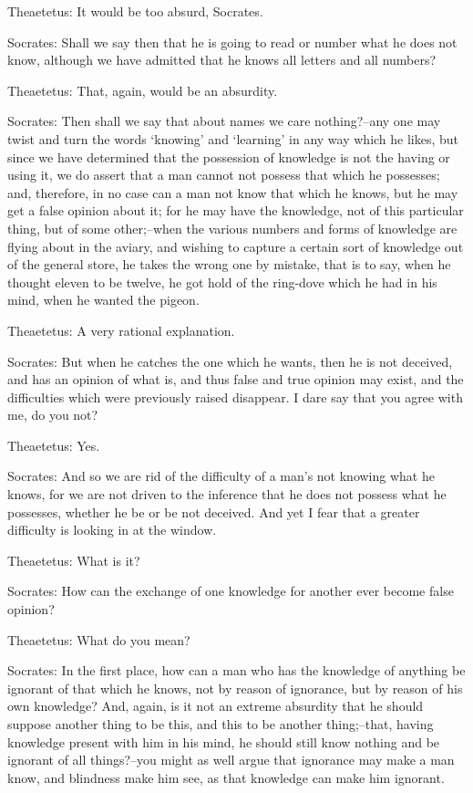 Theaetetus: It would be too absurd, Socrates.

Socrates: Shall we say then that he is going to read or number what he
does not know, although we have admitted that he knows all letters and
all numbers?

Theaetetus: That, again, would be an absurdity.

Socrates: Then shall we say that about names we care nothing?--any one
may twist and turn the words `knowing' and `learning' in any way which
he likes, but since we have determined that the possession of knowledge
is not the having or using it, we do assert that a man cannot not
possess that which he possesses; and, therefore, in no case can a man
not know that which he knows, but he may get a false opinion about it;
for he may have the knowledge, not of this particular thing, but of some
other;--when the various numbers and forms of knowledge are flying about
in the aviary, and wishing to capture a certain sort of knowledge out
of the general store, he takes the wrong one by mistake, that is to say,
when he thought eleven to be twelve, he got hold of the ring-dove which
he had in his mind, when he wanted the pigeon.

Theaetetus: A very rational explanation.

Socrates: But when he catches the one which he wants, then he is not
deceived, and has an opinion of what is, and thus false and true opinion
may exist, and the difficulties which were previously raised disappear.
I dare say that you agree with me, do you not?

Theaetetus: Yes.

Socrates: And so we are rid of the difficulty of a man's not knowing
what he knows, for we are not driven to the inference that he does not
possess what he possesses, whether he be or be not deceived. And yet I
fear that a greater difficulty is looking in at the window.

Theaetetus: What is it?

Socrates: How can the exchange of one knowledge for another ever become
false opinion?

Theaetetus: What do you mean?

Socrates: In the first place, how can a man who has the knowledge of
anything be ignorant of that which he knows, not by reason of ignorance,
but by reason of his own knowledge? And, again, is it not an extreme
absurdity that he should suppose another thing to be this, and this to
be another thing;--that, having knowledge present with him in his mind,
he should still know nothing and be ignorant of all things?--you might
as well argue that ignorance may make a man know, and blindness make him
see, as that knowledge can make him ignorant.

